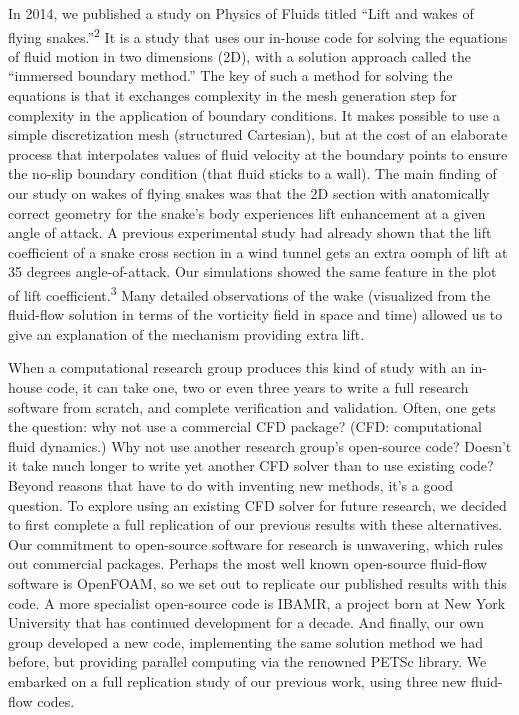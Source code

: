 \documentclass[9pt,twocolumn,twoside]{article}
\newlength{\up}
\begin{document}
In 2014, we published a study on Physics of Fluids titled ``Lift and wakes of flying snakes.''\textsuperscript{2} 
It is a study that uses our in-house code for solving the equations of fluid motion in two dimensions (2D), with a solution approach called the ``immersed boundary method.'' 
The key of such a method for solving the equations is that it exchanges complexity in the mesh generation step for complexity in the application of boundary conditions. 
It makes possible to use a simple discretization mesh (structured Cartesian), but at the cost of an elaborate process that interpolates values of fluid velocity at the boundary points to ensure the no-slip boundary condition (that fluid sticks to a wall). 
The main finding of our study on wakes of flying snakes was that the 2D section with anatomically correct geometry for the snake's body experiences lift enhancement at a given angle of attack.
A previous experimental study had already shown that the lift coefficient of a snake cross section in a wind tunnel gets an extra oomph of lift at 35 degrees angle-of-attack. 
Our simulations showed the same feature in the plot of lift coefficient.\textsuperscript{3} 
Many detailed observations of the wake (visualized from the fluid-flow solution in terms of the vorticity field in space and time) allowed us to give an explanation of the mechanism providing extra lift.

When a computational research group produces this kind of study with an in-house code, it can take one, two or even three years to write a full research software from scratch, and complete verification and validation. 
Often, one gets the question: why not use a commercial CFD package? (CFD: computational fluid dynamics.) 
Why not use another research group's open-source code? 
Doesn't it take much longer to write yet another CFD solver than to use existing code? 
Beyond reasons that have to do with inventing new methods, it's a good question. 
To explore using an existing CFD solver for future research, we decided to first complete a full replication of our previous results with these alternatives. 
Our commitment to open-source software for research is unwavering, which rules out commercial packages. 
Perhaps the most well known open-source fluid-flow software is OpenFOAM, so we set out to replicate our published results with this code. 
A more specialist open-source code is IBAMR, a project born at New York University that has continued development for a decade. 
And finally, our own group developed a new code, implementing the same solution method we had before, but providing parallel computing via the renowned PETSc library. 
We embarked on a full replication study of our previous work, using three new fluid-flow codes.
\end{document}
